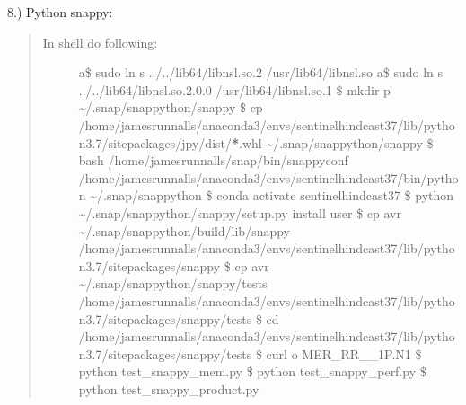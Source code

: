 \documentclass[letterpaper,10pt,english]{sphinxmanual}
\begin{document}
8.) Python \sphinxhyphen{} snappy: 
\begin{quote}
\begin{description}
\item[{In shell do following:}] \leavevmode
a\$ sudo ln \sphinxhyphen{}s ../../lib64/libnsl.so.2 /usr/lib64/libnsl.so
a\$ sudo ln \sphinxhyphen{}s ../../lib64/libnsl.so.2.0.0 /usr/lib64/libnsl.so.1
\$ mkdir \sphinxhyphen{}p \textasciitilde{}/.snap/snap\sphinxhyphen{}python/snappy
\$ cp /home/jamesrunnalls/anaconda3/envs/sentinel\sphinxhyphen{}hindcast\sphinxhyphen{}37/lib/python3.7/site\sphinxhyphen{}packages/jpy/dist/{\color{red}\bfseries{}*}.whl \textasciitilde{}/.snap/snap\sphinxhyphen{}python/snappy
\$ bash /home/jamesrunnalls/snap/bin/snappy\sphinxhyphen{}conf /home/jamesrunnalls/anaconda3/envs/sentinel\sphinxhyphen{}hindcast\sphinxhyphen{}37/bin/python \textasciitilde{}/.snap/snap\sphinxhyphen{}python
\$ conda activate sentinel\sphinxhyphen{}hindcast\sphinxhyphen{}37
\$ python \textasciitilde{}/.snap/snap\sphinxhyphen{}python/snappy/setup.py install \textendash{}user
\$ cp \sphinxhyphen{}avr \textasciitilde{}/.snap/snap\sphinxhyphen{}python/build/lib/snappy /home/jamesrunnalls/anaconda3/envs/sentinel\sphinxhyphen{}hindcast\sphinxhyphen{}37/lib/python3.7/site\sphinxhyphen{}packages/snappy
\$ cp \sphinxhyphen{}avr \textasciitilde{}/.snap/snap\sphinxhyphen{}python/snappy/tests /home/jamesrunnalls/anaconda3/envs/sentinel\sphinxhyphen{}hindcast\sphinxhyphen{}37/lib/python3.7/site\sphinxhyphen{}packages/snappy/tests
\$ cd /home/jamesrunnalls/anaconda3/envs/sentinel\sphinxhyphen{}hindcast\sphinxhyphen{}37/lib/python3.7/site\sphinxhyphen{}packages/snappy/tests
\$ curl  \sphinxhyphen{}o MER\_RR\_\_1P.N1
\$ python test\_snappy\_mem.py
\$ python test\_snappy\_perf.py
\$ python test\_snappy\_product.py

\end{description}
\end{quote}
\end{document}

